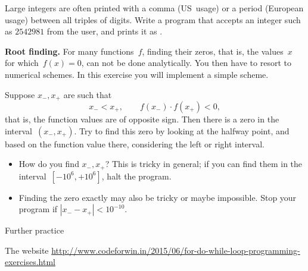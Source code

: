 \begin{exercise}
  Large integers are often printed with a comma (US~usage) or a period
  (European usage) between all triples of digits. Write a program that
  accepts an integer such as $2542981$ from the user, and prints it as
  .
\end{exercise}

\begin{exercise}
  \label{ex:rootfind}
  \textbf{Root finding.}
  For many functions~$f$, finding their zeros, that is, the values~$x$
  for which~$f(x)=0$, can not be done analytically. You then have to
  resort to numerical  schemes. In this
  exercise you will implement a simple scheme.

  Suppose $x_-,x_+$ are such that 
  \[ x_-<x_+,\qquad f(x_-)\cdot f(x_+)<0,\]
  that is, the function values are of opposite sign. Then
  there is a zero in the interval~$(x_-,x_+)$. Try to find this zero
  by looking at the halfway point, and based on the function value
  there, considering the left or right interval.
  \begin{itemize}
  \item How do you find $x_-,x_+$? This is tricky in general; if you
    can find them in the interval~$[-10^6,+10^6]$, halt the program.
  \item Finding the zero exactly may also be tricky or maybe
    impossible. Stop your program if $|x_--x_+|<10^{-10}$.
  \end{itemize}
\end{exercise}

 {Further practice}

The website
\url{http://www.codeforwin.in/2015/06/for-do-while-loop-programming-exercises.html}
